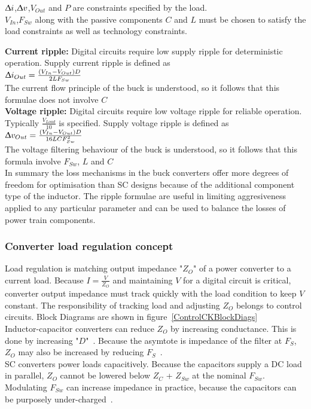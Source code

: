 \documentclass[letterpaper,twocolumn,10pt]{article}
\begin{document}
$\Updelta i$,$\Updelta v$,$V_{Out}$ and $P$ are constraints specified by the load.\\
$V_{In}$,$F_{Sw}$ along with the passive components $C$ and $L$ must be chosen to satisfy the load constraints as well as technology constraints.

\textbf{Current ripple: }Digital circuits require low supply ripple for deterministic operation. Supply current ripple is defined as\\
$\Updelta i_{Out} = \frac{(V_{In} - V_{Out})D}{2LF_{Sw}}$ ~\cite{Kurson2006}\\
The current flow principle of the buck is understood, so it follows that this formulae does not involve $C$\\
\textbf{Voltage ripple: }Digital circuits require low voltage ripple for reliable operation. Typically $\frac{V_{Load}}{10}$ is specified. Supply voltage ripple is defined as\\
$\Updelta v_{Out} = \frac{(V_{In} - V_{Out})D}{16LCF_{Sw}^2}$ ~\cite{Kurson2006}\\
The voltage filtering behaviour of the buck is understood, so it follows that this formula involve $F_{Sw}$, $L$ and $C$\\

\indent In summary the loss mechanisms in the buck converters offer more degrees of freedom for optimisation than SC designs because of the additional component type of the inductor. The ripple formulae are useful in limiting aggresiveness applied to any particular parameter and can be used to balance the losses of power train components.

\subsubsection{Converter load regulation concept}
Load regulation is matching output impedance "$Z_O$" of a power converter to a current load. Because $I= \frac{V}{Z_O}$ and maintaining $V$ for a digital circuit is critical, converter output impedance must track quickly with the load condition to keep $V$ constant. The responsibility of tracking load and adjusting $Z_O$ belongs to control circuits. Block Diagrams are shown in figure~\ref{ControlCKBlockDiags}\\
Inductor-capacitor converters can reduce $Z_O$ by increasing conductance. This is done by increasing "$D$"~\cite{Kurson2006}. Because the asymtote is impedance of the filter at $F_S$, $Z_O$ may also be increased by reducing $F_S$~\cite{Alghamdi2012}.\\ %
SC converters power loads capacitively. Because the capacitors supply a DC load in parallel, $Z_O$ cannot be lowered below $Z_C$ + $Z_{Sw}$ at the nominal $F_{Sw}$. Modulating $F_{Sw}$ can increase impedance in practice, because the capacitors can be purposely under-charged~\cite{Seeman2008}.\\
\end{document}
